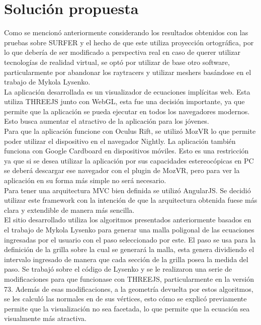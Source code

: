 \documentclass[12pt]{article}
\begin{document}
\section{Solución propuesta}
Como se mencionó anteriormente considerando los resultados obtenidos con las pruebas sobre SURFER  y el hecho de que este utiliza proyección ortográfica, por lo que debería de ser modificado a perspectiva real en caso de querer utilizar tecnologías de realidad virtual, se optó por utilizar de base otro software, particularmente por abandonar los raytracers y utilizar meshers basándose en el trabajo de Mykola Lysenko.
\\La aplicación desarrollada es un visualizador de ecuaciones implícitas web. Esta utiliza THREEJS junto con WebGL, esta fue una decisión importante, ya que permite que la aplicación se pueda ejecutar en todos los navegadores modernos. Esto busca  aumentar el atractivo de la aplicación para los jóvenes.
\\Para que la aplicación funcione con Oculus Rift, se utilizó MozVR lo que permite poder utilizar el dispositivo en el navegador Nightly. La aplicación también funciona con Google Cardboard en dispositivos móviles. Esto es una restricción ya que si se desea utilizar la aplicación por sus capacidades estereocópicas en PC se deberá descargar ese navegador con el plugin de MozVR, pero para ver la aplicación en su forma más simple no será necesario.
\\ Para tener una arquitectura MVC bien definida se utilizó AngularJS. Se decidió utilizar este framework con la intención de que la arquitectura obtenida fuese más clara y extendible de manera más sencilla.
\\El sitio desarrollado utiliza los algoritmos presentados anteriormente basados en el trabajo de Mykola Lysenko\cite{mykola1}\cite{mykola2} para generar una malla poligonal de las ecuaciones ingresadas por el usuario con el paso seleccionado por este. El paso se usa para la definición de la grilla sobre la cual se generará la malla, esta genera dividiendo el intervalo ingresado de manera que cada sección de la grilla posea la medida del paso. Se trabajó sobre el código de Lysenko y se le realizaron una serie de modificaciones para que funcionase con THREEJS, particularmente en la versión 73. Además de esas modificaciones, a la geometría devuelta por estos algoritmos, se les calculó las normales en de sus vértices, esto cómo se explicó previamente permite que la visualización no sea facetada, lo que permite que la ecuación sea visualmente más atractiva. 
\end{document}
